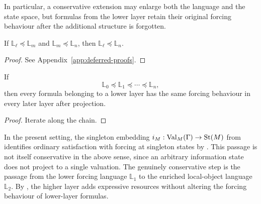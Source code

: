 In particular, a conservative extension may enlarge both the language and the state space, but formulas from the lower layer retain their original forcing behaviour after the additional structure is forgotten.

\begin{proposition}\label{prop:conservative-composition}
If $\mathbb{L}_\ell\preceq\mathbb{L}_m$ and $\mathbb{L}_m\preceq\mathbb{L}_n$, then $\mathbb{L}_\ell\preceq\mathbb{L}_n$.
\end{proposition}

\begin{proof}
See Appendix~\ref{app:deferred-proofs}.
\end{proof}

\begin{corollary}\label{cor:whole-chain-invariance}
If
\[
\mathbb{L}_0\preceq\mathbb{L}_1\preceq\cdots\preceq\mathbb{L}_n,
\]
then every formula belonging to a lower layer has the same forcing behaviour in every later layer after projection.
\end{corollary}

\begin{proof}
Iterate  along the chain.
\end{proof}

In the present setting, the singleton embedding $i_M:\mathrm{Val}_M(\Gamma)\to \mathrm{St}(M)$ from  identifies ordinary satisfaction with forcing at singleton states by . This passage is not itself conservative in the above sense, since an arbitrary information state does not project to a single valuation. The genuinely conservative step is the passage from the lower forcing language $\mathbb{L}_1$ to the enriched local-object language $\mathbb{L}_2$. By , the higher layer adds expressive resources without altering the forcing behaviour of lower-layer formulas.
